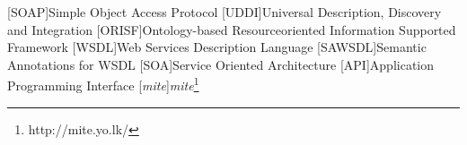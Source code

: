 
[SOAP]{Simple Object Access Protocol}
[UDDI]{Universal Description, Discovery and Integration}
[ORISF]{Ontology-based Resourceoriented Information Supported Framework}
[WSDL]{Web Services Description Language}
[SAWSDL]{Semantic Annotations for WSDL}
[SOA]{Service Oriented Architecture}
[API]{Application Programming Interface}
[\emph{mite}]{\emph{mite}\footnote{http://mite.yo.lk/}}
